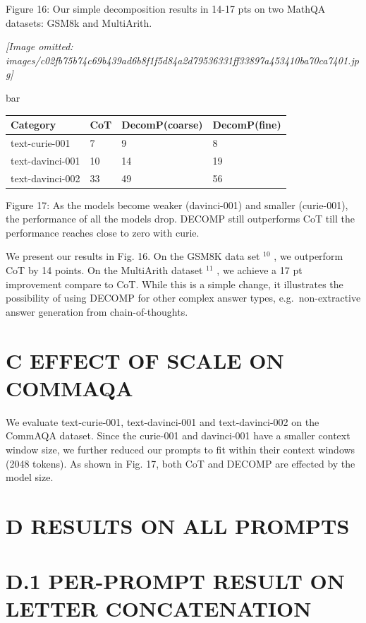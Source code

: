 \documentclass[
]{article}
\newcounter{none} %
\begin{document}
Figure 16: Our simple decomposition results in 14-17 pts on two MathQA
datasets: GSM8k and MultiArith.

\textit{[Image omitted: images/c02fb75b74c69b439ad6b8f1f5d84a2d79536331ff33897a453410ba70ca7401.jpg]}

bar

{\def\LTcaptype{none} %
\begin{longtable}[]{@{}llll@{}}
\toprule\noalign{}
Category & CoT & DecomP(coarse) & DecomP(fine) \\
\midrule\noalign{}
\endhead
\bottomrule\noalign{}
\endlastfoot
text-curie-001 & 7 & 9 & 8 \\
text-davinci-001 & 10 & 14 & 19 \\
text-davinci-002 & 33 & 49 & 56 \\
\end{longtable}
}

Figure 17: As the models become weaker (davinci-001) and smaller
(curie-001), the performance of all the models drop. DECOMP still
outperforms CoT till the performance reaches close to zero with curie.

We present our results in Fig. 16. On the GSM8K data set \(^{10}\) , we
outperform CoT by 14 points. On the MultiArith dataset \(^{11}\) , we
achieve a 17 pt improvement compare to CoT. While this is a simple
change, it illustrates the possibility of using DECOMP for other complex
answer types, e.g.~non-extractive answer generation from
chain-of-thoughts.

\section{C EFFECT OF SCALE ON
COMMAQA}\label{c-effect-of-scale-on-commaqa}

We evaluate text-curie-001, text-davinci-001 and text-davinci-002 on the
CommAQA dataset. Since the curie-001 and davinci-001 have a smaller
context window size, we further reduced our prompts to fit within their
context windows (2048 tokens). As shown in Fig. 17, both CoT and DECOMP
are effected by the model size.

\section{D RESULTS ON ALL PROMPTS}\label{d-results-on-all-prompts}

\section{D.1 PER-PROMPT RESULT ON LETTER
CONCATENATION}\label{d.1-per-prompt-result-on-letter-concatenation}
\end{document}
